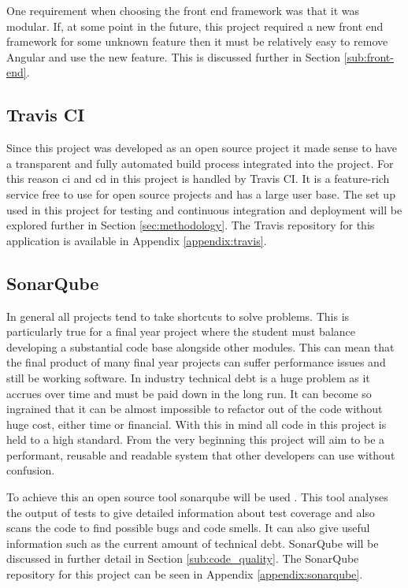 One requirement when choosing the front end framework was that it was modular. If, at some point in the future, this project required a new front end framework for some unknown feature then it must be relatively easy to remove Angular and use the new feature. This is discussed further in Section \ref{sub:front-end}.

\subsection{Travis CI}
Since this project was developed as an open source project it made sense to have a transparent and fully automated build process integrated into the project. For this reason \gls{ci} and \gls{cd} in this project is handled by \gls{Travis} CI. It is a feature-rich service free to use for open source projects and has a large user base. The set up used in this project for testing and continuous integration and deployment will be explored further in Section \ref{sec:methodology}. The Travis repository for this application is available in Appendix \ref{appendix:travis}.

\subsection{SonarQube}
\label{sub:sonarqube-technologies}
In general all projects tend to take shortcuts to solve problems. This is particularly true for a final year project where the student must balance developing a substantial code base alongside other modules. This can mean that the final product of many final year projects can suffer performance issues and still be working software. In industry \gls{technical debt} is a huge problem as it accrues over time and must be paid down in the long run. It can become so ingrained that it can be almost impossible to refactor out of the code without huge cost, either time or financial. With this in mind all code in this project is held to a high standard. From the very beginning this project will aim to be a performant, reusable and readable system that other developers can use without confusion.

To achieve this an open source tool \gls{sonarqube} will be used \citep{Sonar2016}. This tool analyses the output of tests to give detailed information about test coverage and also scans the code to find possible bugs and \gls{code smell}s. It can also give useful information such as the current amount of \gls{technical debt}. SonarQube will be discussed in further detail in Section \ref{sub:code_quality}. The SonarQube repository for this project can be seen in Appendix \ref{appendix:sonarqube}.

